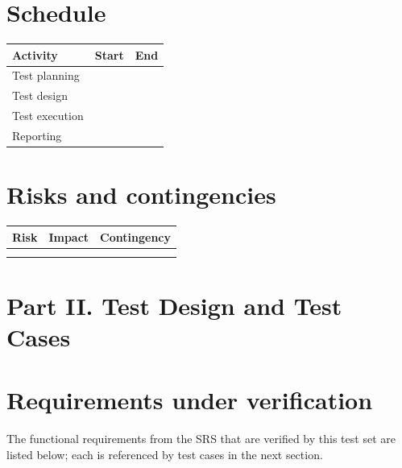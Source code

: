 \documentclass[12pt,a4paper]{extarticle}
\begin{document}
\section{Schedule}
\begin{longtable}{L{6.5cm} L{3.5cm} L{4.0cm}}
\toprule
\textbf{Activity} & \textbf{Start} & \textbf{End} \\
\midrule
\endhead
Test planning &  &  \\
Test design &  &  \\
Test execution &  &  \\
Reporting &  &  \\
\bottomrule
\end{longtable}

\section{Risks and contingencies}
\begin{longtable}{L{5.5cm} L{2.5cm} L{6.0cm}}
\toprule
\textbf{Risk} & \textbf{Impact} & \textbf{Contingency} \\
\midrule
\endhead
{} &  &  \\
 &  &  \\
\bottomrule
\end{longtable}

\section*{Part II. Test Design and Test Cases}

\section{Requirements under verification}
The functional requirements from the SRS that are verified by this test set are listed below; each is referenced by test cases in the next section.
\end{document}
